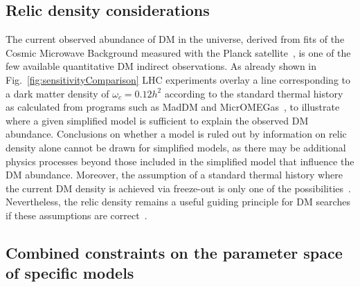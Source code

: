 \subsection{Relic density considerations}


The current observed abundance of DM in the universe, derived from fits of the Cosmic Microwave Background measured with the Planck satellite~\cite{Ade:2015xua}, is one of the few %
available quantitative DM indirect observations. 
As already shown in Fig.~\ref{fig:sensitivityComparison} LHC experiments overlay a line corresponding to  a dark matter density of $\omega_c = 0.12 h^2$ according to the standard thermal history as calculated from programs such as MadDM and MicrOMEGas~\cite{Backovic:2015cra,Barducci:2016pcb}, to illustrate where a given simplified model is sufficient to explain the observed DM abundance. 
Conclusions on whether a model is ruled out by information on relic density alone cannot be drawn for simplified models, as there may be additional physics processes beyond those included in the simplified model that influence the DM abundance.
Moreover, the assumption of a standard thermal history where the current DM density is achieved via freeze-out is only one of the possibilities~\cite{Bernal:2017kxu}. 
Nevertheless, the relic density remains a useful guiding principle for DM searches if these assumptions are correct~\cite{Busoni:2014gta,Catena:2017xqq}. 

\subsection{Combined constraints on the parameter space of specific models}





